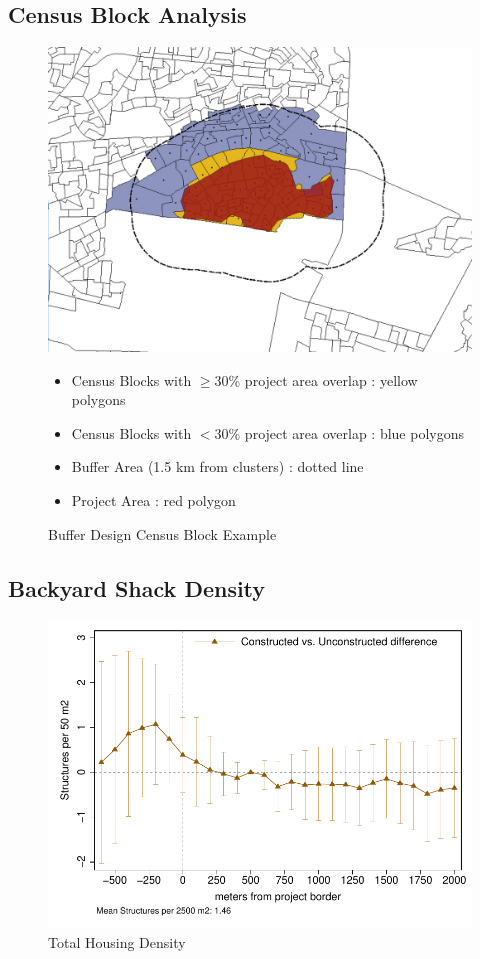 \documentclass[12pt]{article}
\begin{document}
\subsection{Census Block Analysis}

\begin{figure}
\caption{Buffer Design Census Block Example}\label{figure:bufferdesigncensus}
\centering
\includegraphics[scale=.4]{figures/design_7.png} 
\begin{itemize}
\item Census Blocks with $\geq$30\% project area overlap : yellow polygons 
\item Census Blocks with $<$30\% project area overlap : blue polygons
\item Buffer Area (1.5 km from clusters) : dotted line
\item Project Area : red polygon
\end{itemize}
\end{figure}

\subsection{Backyard Shack Density}\label{appendix:backyard}

\begin{figure}
\caption{Total Housing Density}\label{figure:dddbackyard}
\centering
\includegraphics[scale=.8]{figures/distplotDDD_bblu_inf_backyard_admin.pdf}
\end{figure}
\end{document}
